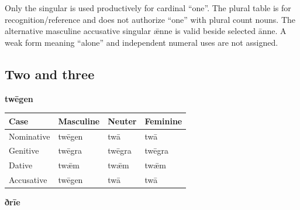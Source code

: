 Only the singular is used productively for cardinal “one”. The plural table is for recognition/\allowbreak{}reference and does not authorize “one” with plural count nouns. The alternative masculine accusative singular ǣnne is valid beside selected ānne. A weak form meaning “alone” and independent numeral uses are not assigned.

\subsection*{Two and three}

\textbf{twēgen}

\par\begingroup
\fontsize{10.5}{13.2}\selectfont
\setlength{\LTleft}{0pt}\setlength{\LTright}{\fill}
\noindent
\begin{tabular}{@{}>{\raggedright\arraybackslash}p{22.0mm}>{\raggedright\arraybackslash}p{31.188mm}>{\raggedright\arraybackslash}p{31.188mm}>{\raggedright\arraybackslash}p{31.188mm}@{}}
\toprule
\textbf{Case} & \textbf{Masculine} & \textbf{Neuter} & \textbf{Feminine} \\
\midrule
Nominative & twēgen & twā & twā \\
Genitive & twēgra & twēgra & twēgra \\
Dative & twǣm & twǣm & twǣm \\
Accusative & twēgen & twā & twā \\
\bottomrule
\end{tabular}
\par\endgroup
\textbf{ðrīe}

